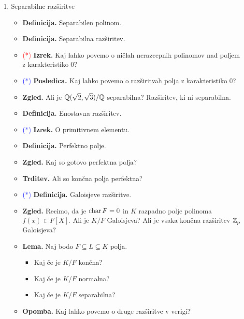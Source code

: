 \begin{enumerate}
    \item Separabilne razširitve
    \begin{itemize}
        \item \textbf{Definicija.} Separabilen polinom.
        \item \textbf{Definicija.} Separabilna razširitev.
        \item \textcolor{red}{(*)} \textbf{Izrek.} Kaj lahko povemo o ničlah nerazcepnih polinomov nad poljem z karakteristiko 0?
        \item \textcolor{blue}{(*)} \textbf{Posledica.} Kaj lahko povemo o razširitvah polja z karakteristiko 0?
        \item \textbf{Zgled.} Ali je \(\mathbb{Q}(\sqrt{2}, \sqrt{3}) / \mathbb{Q}\) separabilna? Razširitev, ki ni separabilna.
        \item \textbf{Definicija.} Enostavna razširitev.
        \item \textcolor{blue}{(*)} \textbf{Izrek.} O primitivnem elementu.
        \item \textbf{Definicija.} Perfektno polje.
        \item \textbf{Zgled.} Kaj so gotovo perfektna polja?
        \item \textbf{Trditev.} Ali so končna polja perfektna?
        \item \textcolor{blue}{(*)} \textbf{Definicija.} Galoisjeve razširitve.
        \item \textbf{Zgled.} Recimo, da je \(\operatorname{char} F = 0\) in \(K\) razpadno polje polinoma \(f(x) \in F[X]\). Ali je \(K/F\) Galoisjeva? Ali je vsaka končna razširitev \(\mathbb{Z}_p\) Galoisjeva?
        \item \textbf{Lema.} Naj bodo \(F \subseteq L \subseteq K\) polja.
        \begin{itemize}
            \item Kaj če je \(K/F\) končna?
            \item Kaj če je \(K/F\) normalna?
            \item Kaj če je \(K/F\) separabilna?
        \end{itemize}

        \item \textbf{Opomba.} Kaj lahko povemo o druge razširitve v verigi? 
    \end{itemize}

\end{enumerate}